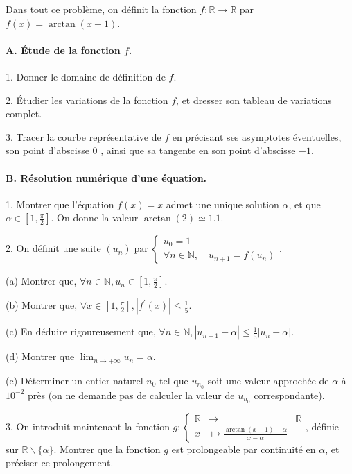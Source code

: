 \documentclass[a4paper, 11pt,reqno]{article}
\begin{document}
\begin{exercice}


Dans tout ce problème, on définit la fonction $f: \mathbb{R} \rightarrow \mathbb{R}$ par $f(x)=\arctan (x+1)$.

\paragraph{A. Étude de la fonction $f$.}

1. Donner le domaine de définition de $f$.

2. Étudier les variations de la fonction $f$, et dresser son tableau de variations complet.

3. Tracer la courbe représentative de $f$ en précisant ses asymptotes éventuelles, son point d'abscisse 0 , ainsi que sa tangente en son point d'abscisse $-1$. 

\paragraph{B. Résolution numérique d'une équation.}

1. Montrer que l'équation $f(x)=x$ admet une unique solution $\alpha$, et que $\alpha \in\left[1, \frac{\pi}{2}\right]$. On donne la valeur $\arctan (2) \simeq 1.1$.

2. On définit une suite $\left(u_{n}\right) \operatorname{par}\left\{\begin{array}{l}u_{0}=1 \\ \forall n \in \mathbb{N}, \quad u_{n+1}=f\left(u_{n}\right)\end{array}\right.$.

(a) Montrer que, $\forall n \in \mathbb{N}, u_{n} \in\left[1, \frac{\pi}{2}\right]$.

(b) Montrer que, $\forall x \in\left[1, \frac{\pi}{2}\right],\left|f^{\prime}(x)\right| \leqslant \frac{1}{5}$.

(c) En déduire rigoureusement que, $\forall n \in \mathbb{N},\left|u_{n+1}-\alpha\right| \leqslant \frac{1}{5}\left|u_{n}-\alpha\right|$.

(d) Montrer que $\lim _{n \rightarrow+\infty} u_{n}=\alpha$.

(e) Déterminer un entier naturel $n_{0}$ tel que $u_{n_{0}}$ soit une valeur approchée de $\alpha$ à $10^{-2}$ près (on ne demande pas de calculer la valeur de $u_{n_{0}}$ correspondante).

3. On introduit maintenant la fonction $g:\left\{\begin{array}{rlc}\mathbb{R} & \rightarrow & \mathbb{R} \\ x & \mapsto \frac{\arctan (x+1)-\alpha}{x-\alpha}\end{array}\right.$, définie sur $\mathbb{R} \backslash\{\alpha\} .$ Montrer que la fonction $g$ est prolongeable par continuité en $\alpha$, et préciser ce prolongement.


\end{exercice}
\end{document}
